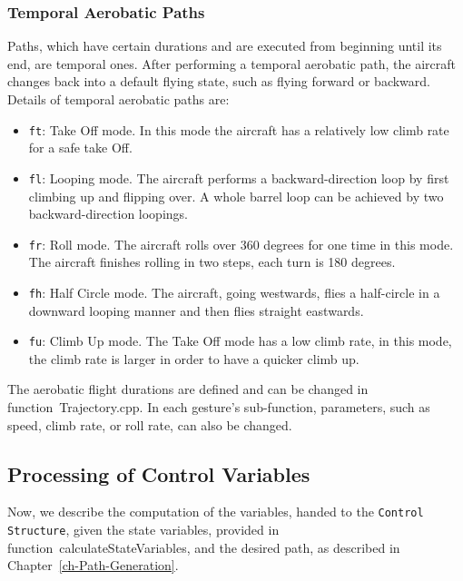 \documentclass[11pt,a4paper]{scrartcl}		%
\begin{document}
\subsubsection*{Temporal Aerobatic Paths}

Paths, which have certain durations and are executed from beginning until its end, are  temporal ones. After performing a temporal aerobatic path, the aircraft changes back into a default flying state, such as flying forward or backward. 
Details of temporal aerobatic paths are:

\begin{itemize}

\item
\texttt{ft}: Take Off mode. In this mode the aircraft has a relatively low climb rate for a safe take Off.

\item
\texttt{fl}: Looping mode. The aircraft performs a backward-direction loop by first climbing up and flipping over. A whole barrel loop can be achieved by two backward-direction loopings. 

\item
\texttt{fr}: Roll mode. The aircraft rolls over 360 degrees for one time in this mode. The aircraft finishes rolling in two steps, each turn is 180 degrees.

\item
\texttt{fh}: Half Circle mode. The aircraft, going westwards, flies a half-circle in a downward looping manner and then flies straight eastwards.

\item
\texttt{fu}: Climb Up mode. The Take Off mode has a low climb rate, in this mode, the climb rate is larger in order to have a quicker climb up.

\end{itemize}

The aerobatic flight durations are defined and can be changed in function~\textsf{Trajectory.cpp}. In each gesture's sub-function, parameters, such as speed, climb rate, or roll rate, can also be changed.

\medskip





\subsection{Processing of Control Variables} \label{ch-control-variables}

Now, we describe the computation of the variables, handed to the \texttt{Control Structure}, given the state variables, provided in function~\textsf{calculateStateVariables}, and the desired path, as described in Chapter~\ref{ch-Path-Generation}.
\end{document}
